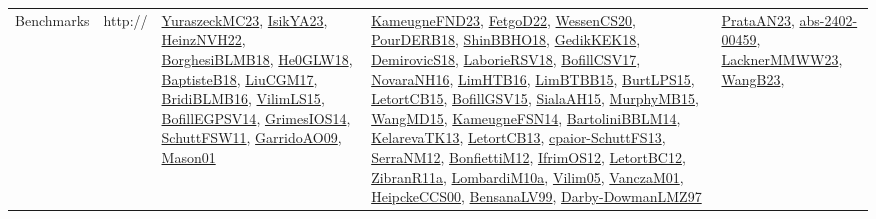 {\begin{longtable}{lp{3cm}>{\raggedright}p{6cm}>{\raggedright}p{6cm}p{8cm}}
Benchmarks & http:// & \href{papers/YuraszeckMC23.pdf}{YuraszeckMC23}\cite{YuraszeckMC23}, \href{articles/IsikYA23.pdf}{IsikYA23}\cite{IsikYA23}, \href{articles/HeinzNVH22.pdf}{HeinzNVH22}\cite{HeinzNVH22}, \href{articles/BorghesiBLMB18.pdf}{BorghesiBLMB18}\cite{BorghesiBLMB18}, \href{papers/He0GLW18.pdf}{He0GLW18}\cite{He0GLW18}, \href{articles/BaptisteB18.pdf}{BaptisteB18}\cite{BaptisteB18}, \href{papers/LiuCGM17.pdf}{LiuCGM17}\cite{LiuCGM17}, \href{articles/BridiBLMB16.pdf}{BridiBLMB16}\cite{BridiBLMB16}, \href{papers/VilimLS15.pdf}{VilimLS15}\cite{VilimLS15}, \href{papers/BofillEGPSV14.pdf}{BofillEGPSV14}\cite{BofillEGPSV14}, \href{articles/GrimesIOS14.pdf}{GrimesIOS14}\cite{GrimesIOS14}, \href{articles/SchuttFSW11.pdf}{SchuttFSW11}\cite{SchuttFSW11}, \href{articles/GarridoAO09.pdf}{GarridoAO09}\cite{GarridoAO09}, \href{articles/Mason01.pdf}{Mason01}\cite{Mason01} & \href{papers/KameugneFND23.pdf}{KameugneFND23}\cite{KameugneFND23}, \href{articles/FetgoD22.pdf}{FetgoD22}\cite{FetgoD22}, \href{papers/WessenCS20.pdf}{WessenCS20}\cite{WessenCS20}, \href{articles/PourDERB18.pdf}{PourDERB18}\cite{PourDERB18}, \href{articles/ShinBBHO18.pdf}{ShinBBHO18}\cite{ShinBBHO18}, \href{articles/GedikKEK18.pdf}{GedikKEK18}\cite{GedikKEK18}, \href{papers/DemirovicS18.pdf}{DemirovicS18}\cite{DemirovicS18}, \href{articles/LaborieRSV18.pdf}{LaborieRSV18}\cite{LaborieRSV18}, \href{papers/BofillCSV17.pdf}{BofillCSV17}\cite{BofillCSV17}, \href{articles/NovaraNH16.pdf}{NovaraNH16}\cite{NovaraNH16}, \href{papers/LimHTB16.pdf}{LimHTB16}\cite{LimHTB16}, \href{papers/LimBTBB15.pdf}{LimBTBB15}\cite{LimBTBB15}, \href{papers/BurtLPS15.pdf}{BurtLPS15}\cite{BurtLPS15}, \href{articles/LetortCB15.pdf}{LetortCB15}\cite{LetortCB15}, \href{papers/BofillGSV15.pdf}{BofillGSV15}\cite{BofillGSV15}, \href{papers/SialaAH15.pdf}{SialaAH15}\cite{SialaAH15}, \href{papers/MurphyMB15.pdf}{MurphyMB15}\cite{MurphyMB15}, \href{articles/WangMD15.pdf}{WangMD15}\cite{WangMD15}, \href{articles/KameugneFSN14.pdf}{KameugneFSN14}\cite{KameugneFSN14}, \href{papers/BartoliniBBLM14.pdf}{BartoliniBBLM14}\cite{BartoliniBBLM14}, \href{papers/KelarevaTK13.pdf}{KelarevaTK13}\cite{KelarevaTK13}, \href{papers/LetortCB13.pdf}{LetortCB13}\cite{LetortCB13}, \href{papers/cpaior-SchuttFS13.pdf}{cpaior-SchuttFS13}\cite{cpaior-SchuttFS13}, \href{papers/SerraNM12.pdf}{SerraNM12}\cite{SerraNM12}, \href{papers/BonfiettiM12.pdf}{BonfiettiM12}\cite{BonfiettiM12}, \href{papers/IfrimOS12.pdf}{IfrimOS12}\cite{IfrimOS12}, \href{papers/LetortBC12.pdf}{LetortBC12}\cite{LetortBC12}, \href{papers/ZibranR11a.pdf}{ZibranR11a}\cite{ZibranR11a}, \href{articles/LombardiM10a.pdf}{LombardiM10a}\cite{LombardiM10a}, \href{papers/Vilim05.pdf}{Vilim05}\cite{Vilim05}, \href{papers/VanczaM01.pdf}{VanczaM01}\cite{VanczaM01}, \href{articles/HeipckeCCS00.pdf}{HeipckeCCS00}\cite{HeipckeCCS00}, \href{articles/BensanaLV99.pdf}{BensanaLV99}\cite{BensanaLV99}, \href{articles/Darby-DowmanLMZ97.pdf}{Darby-DowmanLMZ97}\cite{Darby-DowmanLMZ97} & \href{articles/PrataAN23.pdf}{PrataAN23}\cite{PrataAN23}, \href{articles/abs-2402-00459.pdf}{abs-2402-00459}\cite{abs-2402-00459}, \href{articles/LacknerMMWW23.pdf}{LacknerMMWW23}\cite{LacknerMMWW23}, \href{papers/WangB23.pdf}{WangB23}\cite{WangB23}, 
\end{longtable}}
